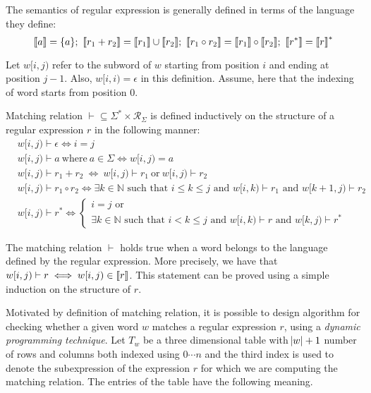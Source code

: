 \noindent
The semantics of regular expression is generally defined in terms of the language they define:
$$\sema{a}=\{a\};\ \sema{r_1+r_2}=\sema{r_1}\cup\sema{r_2};\ \sema{r_1\circ r_2}=\sema{r_1}\circ \sema{r_2};\ \sema{r^*}=\sema{r}^*$$





Let $w[i,j)$ refer to the subword of $w$ starting from position $i$ and ending at position $j-1$. Also, $w[i,i)=\epsilon$ in this definition. Assume, here that the indexing of word starts from position $0$. 

\begin{definition}{\label{def:match-rel}}

Matching relation $\vdash\subseteq\Sigma^\ast\times \mathcal{R}_\Sigma $ is defined inductively on the structure of a regular expression $r$ in the following manner:
\begin{align*}
&w[i,j)\vdash \epsilon \iff i=j\\
&w[i,j)\vdash a\  \text{where}\ a\in \Sigma \iff w[i,j)=a\\
&w[i,j)\vdash r_1+r_2\ \iff\ w[i,j)\vdash r_1\ \text{or}\ w[i,j)\vdash r_2\\
&w[i,j)\vdash r_1\circ r_2  \iff \exists k\in\mathbb{N}\text{ such that } i\leq k\leq j\text{ and } w[i,k)\vdash r_1 \text{ and } w[k+1,j)\vdash r_2 \\
&w[i,j)\vdash r^* \iff  
\begin{cases}
i=j\text{ or}\\
\exists k\in\mathbb{N} \text{ such that } i< k\leq j \text{ and }w[i,k)\vdash r \text{ and } w[k,j)\vdash r^*
\end{cases}
\end{align*}
\end{definition}

The matching relation $\vdash$ holds true when a word belongs to the language defined by the regular expression. More precisely, we have that ${w[i,j)\vdash r\iff w[i,j)\in{\llbracket}r{\rrbracket}}$. This statement can be proved using a simple induction on the structure of $r$. 

Motivated by definition of matching relation, it is possible to design algorithm for checking whether a given word $w$ matches a regular expression $r$, using a \emph{dynamic programming technique}. Let $T_{w}$ be a three dimensional table with $\abs{w}+1$ number of rows and columns both indexed using $0\cdots n$ and the third index is used to denote the subexpression of the expression $r$ for which we are computing the matching relation. The entries of the table have the following meaning.

